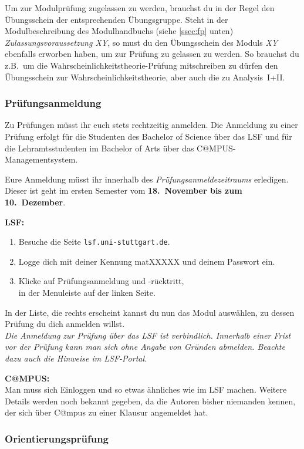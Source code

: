 Um zur Modulprüfung zugelassen zu werden,
brauchst du in der Regel den Übungsschein
der entsprechenden Übungsgruppe.
Steht in der Modulbeschreibung des Modulhandbuchs (siehe \ref{ssec:fp} unten)
{\it Zulassungsvoraussetzung XY},
so must du den Übungsschein des Moduls {\it XY}
ebenfalls erworben haben,
um zur Prüfung zu gelassen zu werden.
So brauchst du z.B.\ um die \glqq Wahrscheinlichkeitstheorie\grqq-Prüfung
mitschreiben zu dürfen den Übungsschein
zur Wahrscheinlichkeitstheorie,
aber auch die zu Analysis~I+II.

\subsubsection{Prüfungsanmeldung}\label{sssec:pa}

Zu Prüfungen müsst ihr euch stets rechtzeitig anmelden.
Die Anmeldung zu einer Prüfung erfolgt
für die Studenten des Bachelor of Science
über das LSF
und für die Lehramtsstudenten im Bachelor of Arts
über das C@MPUS-Managementsystem.

Eure Anmeldung müsst ihr innerhalb
des {\it Prüfungsanmeldezeitraums} erledigen.
Dieser ist geht im ersten Semester
vom {\bf 18.~November bis zum 10.~Dezember}.

{\bf LSF:}
\begin{enumerate}
\item
Besuche die Seite {\small\verb|lsf.uni-stuttgart.de|}.
\item
Logge dich mit deiner Kennung matXXXXX und deinem Passwort ein.
\item
Klicke auf \glqq Prüfungsanmeldung und -rücktritt\grqq,\\
in der Menuleiste auf der linken Seite.
\end{enumerate}
In der Liste, die rechts erscheint
kannst du nun das Modul auswählen,
zu dessen Prüfung du dich anmelden willst.\\
{\it Die Anmeldung zur Prüfung über das LSF ist verbindlich.
Innerhalb einer Frist vor der Prüfung
kann man sich ohne Angabe von Gründen abmelden.
Beachte dazu auch die Hinweise im LSF-Portal.}

{\bf C@MPUS:}\\
Man muss sich Einloggen und
so etwas ähnliches wie im LSF machen.
Weitere Details werden noch bekannt gegeben,
da die Autoren bisher niemanden kennen, der sich über C@mpus
zu einer Klausur angemeldet hat.

\subsubsection{Orientierungsprüfung}\label{sssec:or}

